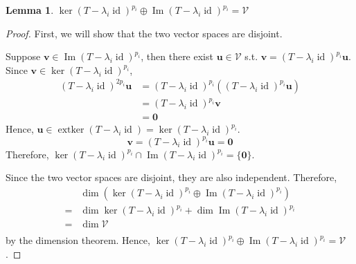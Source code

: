 \documentclass{article}
\theoremstyle{plain}
\newtheorem{lemma}[theorem]{Lemma}
\theoremstyle{definition}
\newcommand{\0}{\mathbf{0}}
\renewcommand{\vec}{\mathbf}
\newcommand{\vecspace}[1]{\mathcal{#1}}
\DeclareMathOperator{\extker}{extker}
\DeclareMathOperator{\id}{id}
\DeclareMathOperator{\img}{Im}
\begin{document}
\begin{lemma}
    \label{lemma:img_sum_ker}
    $\ker(T-\lambda_i\id)^{p_i}\oplus\img(T-\lambda_i\id)^{p_i}=\vecspace{V}$
\end{lemma}
\begin{proof}
    First, we will show that the two vector spaces are disjoint.

    Suppose $\vec{v} \in \img(T-\lambda_i\id)^{p_i}$, then there exist $\vec{u}\in\vecspace{V}$ s.t. $\vec{v}=(T-\lambda_i\id)^{p_i}\vec{u}$.
    Since $\vec{v}\in\ker(T-\lambda_i\id)^{p_i}$,
    \begin{align*}
        (T-\lambda_i\id)^{2p_i}\vec{u}
        &=(T-\lambda_i\id)^{p_i}\left((T-\lambda_i\id)^{p_i}\vec{u}\right)\\
        &=(T-\lambda_i\id)^{p_i}\vec{v}\\
        &=\0
    \end{align*}
    Hence, $\vec{u}\in\extker(T-\lambda_i\id)=\ker(T-\lambda_i\id)^{p_i}$.
    \begin{equation*}
        \vec{v} = (T-\lambda_i\id)^{p_i}\vec{u} = \0
    \end{equation*}
    Therefore, $\ker(T-\lambda_i\id)^{p_i}\cap\img(T-\lambda_i\id)^{p_i}=\{\0\}$.

    Since the two vector spaces are disjoint, they are also independent.
    Therefore,
    \begin{align*}
        &\dim\left(\ker(T-\lambda_i\id)^{p_i}\oplus\img(T-\lambda_i\id)^{p_i}\right)\\
        =&\dim\ker(T-\lambda_i\id)^{p_i} + \dim\img(T-\lambda_i\id)^{p_i}\\
        =&\dim\vecspace{V}\\
    \end{align*}
    by the dimension theorem.
    Hence, $\ker(T-\lambda_i\id)^{p_i}\oplus\img(T-\lambda_i\id)^{p_i}=\vecspace{V}$.
\end{proof}
\end{document}
